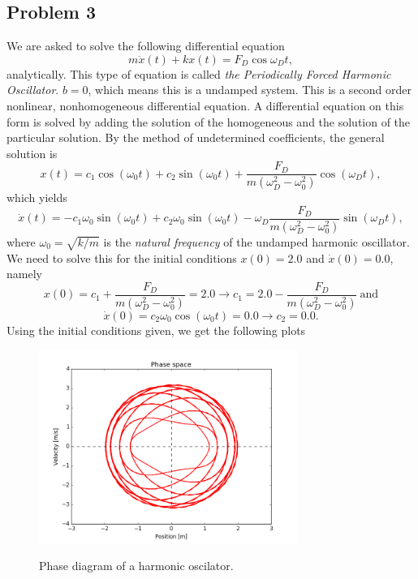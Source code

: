 \documentclass{article}
\begin{document}
\subsection*{Problem 3}
We are asked to solve the following differential equation
\begin{equation}
m\ddot{x}(t) + kx(t) = F_D\cos{\omega_Dt},
\end{equation}
analytically. This type of equation is called \textit{the Periodically Forced Harmonic Oscillator}. $b=0$, which means this is a undamped system. This is a second order nonlinear, nonhomogeneous differential equation. A differential equation on this form is solved by adding the solution of the homogeneous and the solution of the particular solution. By the method of undetermined coefficients, the general solution is
\begin{equation}
x(t) = c_1\cos{(\omega_0t)} + c_2\sin{(\omega_0t)} + \frac{F_D}{m(\omega_D^2 - \omega_0^2)}\cos{(\omega_D t)},
\end{equation}
which yields
\begin{equation}
\dot{x}(t) = -c_1\omega_0\sin{(\omega_0t)} + c_2\omega_0\sin{(\omega_0t)} - \omega_D\frac{F_D}{m(\omega_D^2 - \omega_0^2)}\sin{(\omega_D t)},
\end{equation}
where $\omega_0 = \sqrt{k/m}$ is the \textit{natural frequency} of the undamped harmonic oscillator.
We need to solve this for the initial conditions $x(0) = 2.0$ and $\dot{x}(0) = 0.0$, namely
\begin{equation}
x(0) = c_1 + \frac{F_D}{m(\omega_D^2 - \omega_0^2)} = 2.0 \rightarrow c_1 = 2.0 - \frac{F_D}{m(\omega_D^2 - \omega_0^2)} \ \text{and}
\end{equation}
\begin{equation}
\dot{x}(0) = c_2\omega_0\cos{(\omega_0t)} = 0.0 \rightarrow c_2 = 0.0.
\end{equation}
Using the initial conditions given, we get the following plots
\begin{figure}[H]
\centering
\includegraphics[width=0.75\textwidth]{problem_3_1}\label{figure_1}
\caption{Phase diagram of a harmonic oscilator.}
\label{fig:problem_b_contour_fig}
\end{figure}
\end{document}
